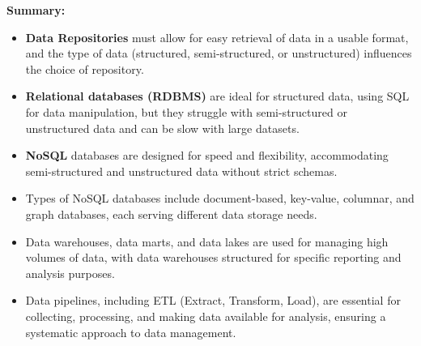 \documentclass[12pt]{report} %
\begin{document}
		\noindent \textbf{Summary:}
		\begin{itemize}
			\item \textbf{Data Repositories} must allow for easy retrieval of data in a usable format, and the type of data (structured, semi-structured, or unstructured) influences the choice of repository.
			\item \textbf{Relational databases (RDBMS)} are ideal for structured data, using SQL for data manipulation, but they struggle with semi-structured or unstructured data and can be slow with large datasets.
			\item \textbf{NoSQL} databases are designed for speed and flexibility, accommodating semi-structured and unstructured data without strict schemas.
			\item Types of NoSQL databases include document-based, key-value, columnar, and graph databases, each serving different data storage needs.
			\item Data warehouses, data marts, and data lakes are used for managing high volumes of data, with data warehouses structured for specific reporting and analysis purposes.
			\item Data pipelines, including ETL (Extract, Transform, Load), are essential for collecting, processing, and making data available for analysis, ensuring a systematic approach to data management.
		\end{itemize}
\end{document}
